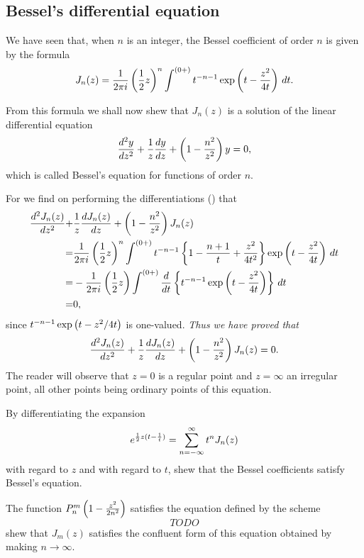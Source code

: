 \documentclass{book}
\begin{document}
\subsection{Bessel's differential equation}
We have seen that, when $n$ is an integer, the Bessel coefficient of
order $n$ is given by the formula
$$
J_n(z)
=
\frac{1}{2\pi i} 
\left( \frac{1}{2} z \right)^n
\int^{(0+)}
t^{-n-1}
\exp\left(  t - \frac{z^2}{4t}   \right)
\, d t.
$$

From this formula we shall now shew that $J_n(z)$ is a solution of the
linear differential equation
$$
\frac{d^2 y}{dz^2}
+ \frac{1}{z} \frac{dy}{dz}
+ \left(  1 - \frac{n^2}{z^2}   \right) y
= 0,
$$
which is called Bessel's equation for functions of order $n$.

For we find on performing the differentiations 
() that
\begin{align*}
\frac{d^2 J_n(z)}{dz^2}
+& \frac{1}{z} \frac{d J_n(z)}{dz}
+ \theparen{ 1 - \frac{n^2}{z^2}  } J_n(z)
 \\
%
=& 
\frac{1}{2\pi i} 
\theparen{ \half z  }^n 
\int^{(0+)}
t^{-n-1}
\thebrace{ 1 - \frac{n+1}{t} + \frac{z^2}{4t^2}  }
\exp\theparen{ t - \frac{z^2}{4t}  }
\dmeasure t \\
%
=& 
-\frac{1}{2\pi i}
\theparen{ \half z  }
\int^{(0+)}
\frac{d}{dt} \thebrace{ t^{-n-1} \exp\theparen{ t - \frac{z^2}{4t}  }
}
\dmeasure t \\
%
=& 0,
\end{align*}
since $t^{-n-1} \exp\left(  t - z^2/4t   \right)$ is one-valued.
\emph{Thus we have proved that }
$$
\frac{d^2 J_n(z)}{dz^2}
+ \frac{1}{z} \frac{d J_n(z)}{dz}
+ \left(  1 - \frac{n^2}{z^2}   \right) J_n(z) 
= 0.
$$
The reader will observe that $z=0$ is a regular point and 
$z = \infty$ an irregular point, all other points being ordinary
points of this equation.
%
%
\begin{wandwexample}
  By differentiating the expansion
  $$
  e^{\frac{1}{2} z (t - \frac{1}{t})} = \sum_{n=-\infty}^{\infty} t^n J_n(z)
  $$
  with regard to $z$ and with regard to $t$, shew that the Bessel
  coefficients satisfy Bessel's equation.
\end{wandwexample}
\begin{wandwexample}
  The function $P_n^m\left(  1 - \frac{z^2}{2n^2}   \right)$ satisfies the
  equation defined by the scheme
  $$
  TODO
  $$
  shew that $J_m(z)$ satisfies the confluent form of this equation
  obtained by making $n \rightarrow \infty$.
\end{wandwexample}
\end{document}
